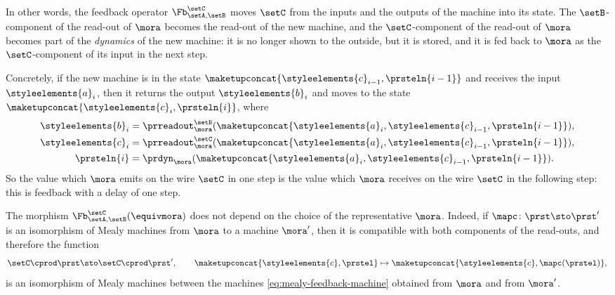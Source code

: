 In other words, the feedback operator $\Fb_{\setA, \setB}^{\setC}$ moves $\setC$ from the inputs and the outputs of the machine into its state.
The $\setB$-component of the read-out of $\mora$ becomes the read-out of the new machine, and the $\setC$-component of the read-out of $\mora$ becomes part of the \emph{dynamics} of the new machine: it is no longer shown to the outside, but it is stored, and it is fed back to $\mora$ as the $\setC$-component of its input in the next step.

Concretely, if the new machine is in the state $\maketupconcat{\styleelements{c}_{i-1}, \prsteln{i-1}}$ and receives the input $\styleelements{a}_i$, then it returns the output $\styleelements{b}_i$ and moves to the state $\maketupconcat{\styleelements{c}_i, \prsteln{i}}$, where
\begin{equation}
    \label{eq:mealy-feedback-steps}
    \begin{aligned}
        \styleelements{b}_i         & = \prreadout_\mora^{\setB}(\maketupconcat{\styleelements{a}_i, \styleelements{c}_{i-1}, \prsteln{i-1}}), \\
        \styleelements{c}_i         & = \prreadout_\mora^{\setC}(\maketupconcat{\styleelements{a}_i, \styleelements{c}_{i-1}, \prsteln{i-1}}), \\
        \prsteln{i} & = \prdyn_\mora(\maketupconcat{\styleelements{a}_i, \styleelements{c}_{i-1}, \prsteln{i-1}}).
    \end{aligned}
\end{equation}
So the value which $\mora$ emits on the wire $\setC$ in one step is the value which $\mora$ receives on the wire $\setC$ in the following step: this is feedback with a delay of one step.

The morphism $\Fb_{\setA, \setB}^{\setC}(\equivmora)$ does not depend on the choice of the representative $\mora$.
Indeed, if $\mapc \colon \prst \sto \prst'$ is an isomorphism of Mealy machines from $\mora$ to a machine $\mora'$, then it is compatible with both components of the read-outs, and therefore the function
\begin{equation}
    \setC \cprod \prst \sto \setC \cprod \prst', \qquad \maketupconcat{\styleelements{c}, \prstel} \mapsto \maketupconcat{\styleelements{c}, \mapc(\prstel)},
\end{equation}
is an isomorphism of Mealy machines between the machines \cref{eq:mealy-feedback-machine} obtained from $\mora$ and from $\mora'$.

